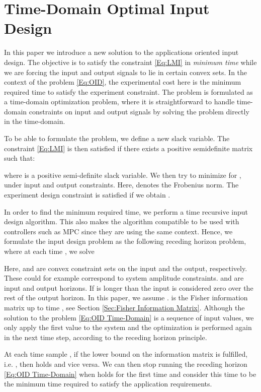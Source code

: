 \documentclass{ifacconf}
\begin{document}
\section{Time-Domain Optimal Input Design}
\label{sec:Time-Domain Optimal Input Design}
In this paper we introduce a new solution to the applications oriented input design. The objective is to satisfy the constraint \eqref{Eq:LMI} in \emph{minimum time} while we are forcing the input and output signals to lie in certain convex sets. In the context of the problem \eqref{Eq:OID}, the experimental cost here is the minimum required time to satisfy the experiment constraint. The problem is formulated as a time-domain optimization problem, where it is straightforward to handle time-domain constraints on input and output signals by solving the problem directly in the time-domain. 

To be able to formulate the problem, we define a new slack variable. The constraint \eqref{Eq:LMI} is then satisfied if there exists a positive semidefinite matrix  such that: 

where  is a positive semi-definite slack variable. We then try to minimize  for , under input and output constraints. Here,  denotes the Frobenius norm. The experiment design constraint is satisfied if we obtain .

In order to find the minimum required time, we perform a time recursive input design algorithm. This also makes the algorithm compatible to be used with controllers such as MPC since they are using the same context. Hence, we formulate the input design problem as the following receding horizon problem, where at each time , we solve
\vspace{-0.4cm}

Here,  and  are convex constraint sets on the input and the output, respectively. These could for example correspond to system amplitude constraints.  and  are input and output horizons. If  is longer than  the input is considered zero over the rest of the output horizon. In this paper, we assume . is the Fisher information matrix up to time , see Section \ref{Sec:Fisher Information Matrix}. Although the solution to the problem \eqref{Eq:OID Time-Domain} is a sequence of input values, we only apply the first value to the system and the optimization is performed again in the next time step, according to the receding horizon principle.

At each time sample , if the lower bound on the information matrix is fulfilled, i.e. , then  holds and vice versa.  We can then stop running the receding horizon \eqref{Eq:OID Time-Domain} when  holds for the first time and consider this time to be the minimum time required to satisfy the application requirements.
\end{document}
